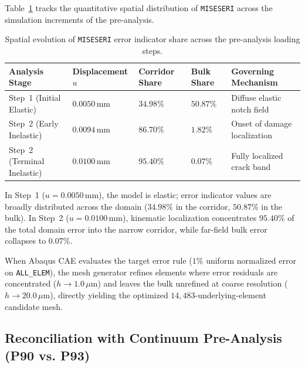Table~\ref{tab:stage14r_error_evolution} tracks the quantitative spatial distribution of \texttt{MISESERI} across the simulation increments of the pre-analysis.

\begin{table}[htbp]
\centering
\small
\caption{Spatial evolution of \texttt{MISESERI} error indicator share across the pre-analysis loading steps.}
\label{tab:stage14r_error_evolution}
\begin{tabularx}{\textwidth}{p{3.2cm} p{2.2cm} p{2.5cm} p{2.5cm} X}
\toprule
\textbf{Analysis Stage} & \textbf{Displacement $u$} & \textbf{Corridor Share} & \textbf{Bulk Share} & \textbf{Governing Mechanism} \\
\midrule
Step~1 (Initial Elastic) & $0.0050\,\mathrm{mm}$ & $34.98\%$ & $50.87\%$ & Diffuse elastic notch field \\
Step~2 (Early Inelastic) & $0.0094\,\mathrm{mm}$ & $86.70\%$ & $1.82\%$ & Onset of damage localization \\
Step~2 (Terminal Inelastic) & $0.0100\,\mathrm{mm}$ & $95.40\%$ & $0.07\%$ & Fully localized crack band \\
\bottomrule
\end{tabularx}
\end{table}

In Step~1 ($u = 0.0050\,\mathrm{mm}$), the model is elastic; error indicator values are broadly distributed across the domain ($34.98\%$ in the corridor, $50.87\%$ in the bulk). In Step~2 ($u = 0.0100\,\mathrm{mm}$), kinematic localization concentrates \textbf{$95.40\%$} of the total domain error into the narrow corridor, while far-field bulk error collapses to \textbf{$0.07\%$}.

When Abaqus CAE evaluates the target error rule ($1\%$ uniform normalized error on \texttt{ALL\_ELEM}), the mesh generator refines elements where error residuals are concentrated ($h \to 1.0\,\mu\mathrm{m}$) and leaves the bulk unrefined at coarse resolution ($h \to 20.0\,\mu\mathrm{m}$), directly yielding the optimized $14,483$-underlying-element candidate mesh.

\subsection{Reconciliation with Continuum Pre-Analysis (P90 vs. P93)}
\label{subsec:stage14r_p90_reconciliation}

